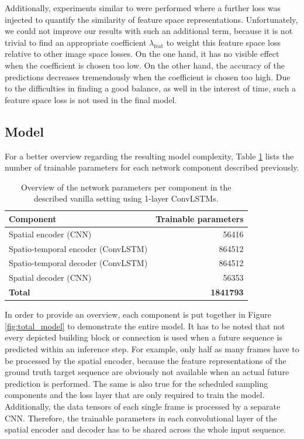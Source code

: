 Additionally, experiments similar to \parencite{gen_img_perc_sim} were performed where a further loss was injected to quantify the similarity of feature space representations. Unfortunately, we could not improve our results with such an additional term, because it is not trivial to find an appropriate coefficient $\lambda_{\textrm{feat}}$ to weight this feature space loss relative to other image space losses. On the one hand, it has no visible effect when the coefficient is chosen too low. On the other hand, the accuracy of the predictions decreases tremendously when the coefficient is chosen too high. Due to the difficulties in finding a good balance, as well in the interest of time, such a feature space loss is not used in the final model.


\subsection{Model}

For a better overview regarding the resulting model complexity, Table \ref{tab:model_params} lists the number of trainable parameters for each network component described previously.

\begin{table}[htpb]
  \small
  \centering
  \begin{tabular}{l r}
    \toprule
      \textbf{Component} & \textbf{Trainable parameters} \\
    \midrule
      Spatial encoder \scriptsize{(CNN)} & \num{56416} \\
      Spatio-temporal encoder \scriptsize{(ConvLSTM)} & \num{864512} \\
      Spatio-temporal decoder \scriptsize{(ConvLSTM)} & \num{864512} \\
      Spatial decoder \scriptsize{(CNN)} & \num{56353} \\
    \midrule
    \midrule
      \textbf{Total} & \textbf{\num{1841793}} \\
    \bottomrule
  \end{tabular}
  \caption[Model Parameters]{Overview of the network parameters per component in the described vanilla setting using 1-layer ConvLSTMs.}\label{tab:model_params}
\end{table}

In order to provide an overview, each component is put together in Figure \ref{fig:total_model} to demonstrate the entire model. It has to be noted that not every depicted building block or connection is used when a future sequence is predicted within an inference step. For example, only half as many frames have to be processed by the spatial encoder, because the feature representations of the ground truth target sequence are obviously not available when an actual future prediction is performed. The same is also true for the scheduled sampling components and the loss layer that are only required to train the model. Additionally, the data tensors of each single frame is processed by a separate CNN. Therefore, the trainable parameters in each convolutional layer of the spatial encoder and decoder has to be shared across the whole input sequence. 

